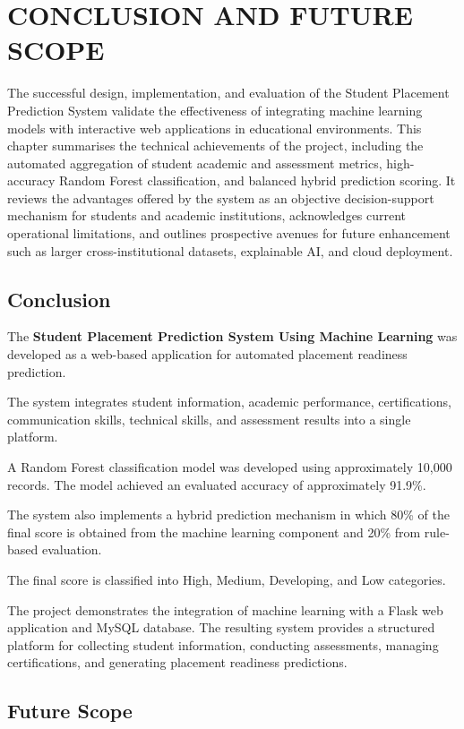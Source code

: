 \documentclass[12pt,a4paper]{report}
\begin{document}
\chapter{CONCLUSION AND FUTURE SCOPE}

The successful design, implementation, and evaluation of the Student Placement
Prediction System validate the effectiveness of integrating machine learning
models with interactive web applications in educational environments. This
chapter summarises the technical achievements of the project, including the
automated aggregation of student academic and assessment metrics, high-accuracy
Random Forest classification, and balanced hybrid prediction scoring. It reviews
the advantages offered by the system as an objective decision-support mechanism
for students and academic institutions, acknowledges current operational
limitations, and outlines prospective avenues for future enhancement such as
larger cross-institutional datasets, explainable AI, and cloud deployment.

\section{Conclusion}

The \textbf{Student Placement Prediction System Using Machine
Learning} was developed as a web-based application for automated
placement readiness prediction.

The system integrates student information, academic performance,
certifications, communication skills, technical skills, and
assessment results into a single platform.

A Random Forest classification model was developed using
approximately 10,000 records. The model achieved an evaluated
accuracy of approximately 91.9\%.

The system also implements a hybrid prediction mechanism in which
80\% of the final score is obtained from the machine learning
component and 20\% from rule-based evaluation.

The final score is classified into High, Medium, Developing, and
Low categories.

The project demonstrates the integration of machine learning with
a Flask web application and MySQL database. The resulting system
provides a structured platform for collecting student information,
conducting assessments, managing certifications, and generating
placement readiness predictions.

\section{Future Scope}
\end{document}
